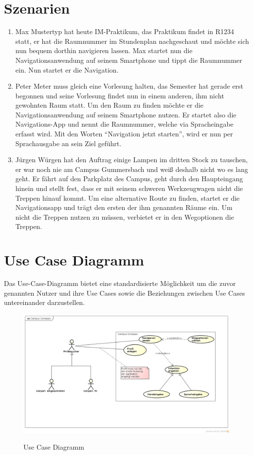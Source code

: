 \section{Szenarien}
\begin{enumerate}
  \item Max Mustertyp hat heute IM-Praktikum, das Praktikum findet in R1234
    statt, er hat die Raumnummer im Stundenplan nachgeschaut und möchte sich nun
    bequem dorthin navigieren lassen. Max startet nun die Navigationsanwendung
    auf seinem Smartphone und tippt die Raumnummer ein. Nun startet er die
    Navigation.
  \item Peter Meter muss gleich eine Vorlesung halten, das Semester hat gerade
    erst begonnen und seine Vorlesung findet nun in einem anderen, ihm nicht
    gewohnten Raum statt. Um den Raum zu finden möchte er die
    Navigationsanwendung auf seinem Smartphone nutzen. Er startet also die
    Navigations-App und nennt die Raumnummer, welche via Spracheingabe erfasst
    wird. Mit den Worten “Navigation jetzt starten”, wird er nun per
    Sprachausgabe an sein Ziel geführt.
  \item Jürgen Würgen hat den Auftrag einige Lampen im dritten Stock zu
    tauschen, er war noch nie am Campus Gummersbach und weiß deshalb nicht wo es
    lang geht. Er fährt auf den Parkplatz des Campus, geht durch den
    Haupteingang hinein und stellt fest, dass er mit seinem schweren
    Werkzeugwagen nicht die Treppen hinauf kommt. Um eine alternative Route zu
    finden, startet er die Navigationsapp und trägt den ersten der ihm genannten
    Räume ein. Um nicht die Treppen nutzen zu müssen, verbietet er in den
    Wegoptionen die Treppen.
\end{enumerate}

\section{Use Case Diagramm}
Das Use-Case-Diagramm bietet eine standardisierte Möglichkeit um die zuvor
genannten Nutzer und ihre Use Cases sowie die Beziehungen zwischen Use Cases
untereinander darzustellen.

\begin{figure}[hbt]
  \centering
  \includegraphics[width=\linewidth]{img/use-case-diagram.png}
  \label{img:use-case-diagramm}
  \caption{Use Case Diagramm}
\end{figure}

